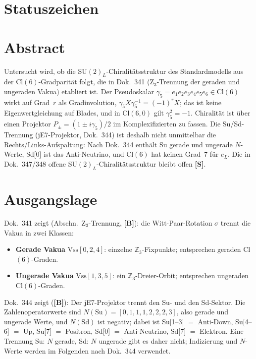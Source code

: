 
\providecommand{\BM}{\textbf{[B]}}
\providecommand{\KM}{\textbf{[K]}}
\providecommand{\SM}{\textbf{[S]}}

{}

\setcounter{section}{0}
\section*{Statuszeichen}


\section*{Abstract}

Untersucht wird, ob die SU$(2)_L$-Chiralitätsstruktur des Standardmodells
aus der Cl$(6)$-Gradparität folgt, die in Dok.~341 (Z$_3$-Trennung der
geraden und ungeraden Vakua) etabliert ist. Der Pseudoskalar
$\gamma_5 = e_1 e_2 e_3 e_4 e_5 e_6 \in \mathrm{Cl}(6)$ wirkt auf Grad~$r$
als Gradinvolution, $\gamma_5 X \gamma_5^{-1} = (-1)^r X$; das ist keine
Eigenwertgleichung auf Blades, und in Cl$(6,0)$ gilt $\gamma_5^2 = -1$.
Chiralität ist über einen Projektor $P_\pm = (1 \pm i\gamma_5)/2$ im
Komplexifizierten zu fassen. Die Su/Sd-Trennung (jE7-Projektor, Dok.~344)
ist deshalb nicht unmittelbar die Rechts/Links-Aufspaltung: Nach Dok.~344
enthält Su gerade und ungerade $N$-Werte, Sd[0] ist das Anti-Neutrino, und
Cl$(6)$ hat keinen Grad~7 für $e_L$. Die in Dok.~347/348 offene
SU$(2)_L$-Chiralitätsstruktur bleibt offen \SM.

\section{Ausgangslage}

Dok.~341 zeigt (Abschn.\ Z$_3$-Trennung, \BM): die Witt-Paar-Rotation
$\sigma$ trennt die Vakua in zwei Klassen:
\begin{itemize}
\item \textbf{Gerade Vakua} $\mathrm{Vss}[0,2,4]$: einzelne
  $\mathbb{Z}_3$-Fixpunkte; entsprechen geraden Cl$(6)$-Graden.
\item \textbf{Ungerade Vakua} $\mathrm{Vss}[1,3,5]$: ein
  $\mathbb{Z}_3$-Dreier-Orbit; entsprechen ungeraden Cl$(6)$-Graden.
\end{itemize}
Dok.~344 zeigt (\BM): Der jE7-Projektor trennt den Su- und den Sd-Sektor.
Die Zahlenoperatorwerte sind $N(\mathrm{Su}) = [0,1,1,1,2,2,2,3]$, also
gerade und ungerade Werte, und $N(\mathrm{Sd})$ ist negativ; dabei ist
Su[1--3] $=$ Anti-Down, Su[4--6] $=$ Up, Su[7] $=$ Positron,
Sd[0] $=$ Anti-Neutrino, Sd[7] $=$ Elektron. Eine Trennung
\glqq Su: $N$ gerade, Sd: $N$ ungerade\grqq{} gibt es daher nicht;
Indizierung und $N$-Werte werden im Folgenden nach Dok.~344 verwendet.

